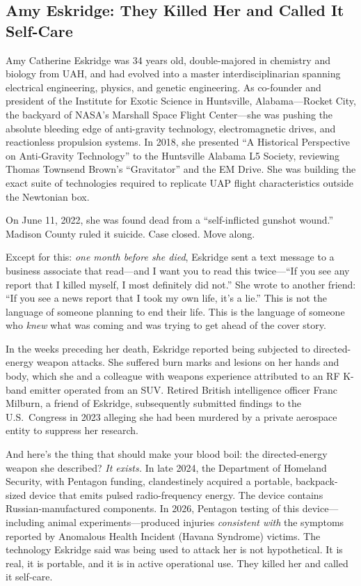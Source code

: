 \documentclass[11pt,a4paper]{article}
\begin{document}
\subsection{Amy Eskridge: They Killed Her and Called It Self-Care}

Amy Catherine Eskridge was 34 years old, double-majored in chemistry and biology from UAH, and had evolved into a master interdisciplinarian spanning electrical engineering, physics, and genetic engineering. As co-founder and president of the Institute for Exotic Science in Huntsville, Alabama---Rocket City, the backyard of NASA's Marshall Space Flight Center---she was pushing the absolute bleeding edge of anti-gravity technology, electromagnetic drives, and reactionless propulsion systems. In 2018, she presented ``A Historical Perspective on Anti-Gravity Technology'' to the Huntsville Alabama L5 Society, reviewing Thomas Townsend Brown's ``Gravitator'' and the EM Drive. She was building the exact suite of technologies required to replicate UAP flight characteristics outside the Newtonian box.

On June 11, 2022, she was found dead from a ``self-inflicted gunshot wound.'' Madison County ruled it suicide. Case closed. Move along.

Except for this: \textit{one month before she died}, Eskridge sent a text message to a business associate that read---and I want you to read this twice---``If you see any report that I killed myself, I most definitely did not.'' She wrote to another friend: ``If you see a news report that I took my own life, it's a lie.'' This is not the language of someone planning to end their life. This is the language of someone who \textit{knew} what was coming and was trying to get ahead of the cover story.

In the weeks preceding her death, Eskridge reported being subjected to directed-energy weapon attacks. She suffered burn marks and lesions on her hands and body, which she and a colleague with weapons experience attributed to an RF K-band emitter operated from an SUV. Retired British intelligence officer Franc Milburn, a friend of Eskridge, subsequently submitted findings to the U.S.\ Congress in 2023 alleging she had been murdered by a private aerospace entity to suppress her research.

And here's the thing that should make your blood boil: the directed-energy weapon she described? \textit{It exists.} In late 2024, the Department of Homeland Security, with Pentagon funding, clandestinely acquired a portable, backpack-sized device that emits pulsed radio-frequency energy. The device contains Russian-manufactured components. In 2026, Pentagon testing of this device---including animal experiments---produced injuries \textit{consistent with} the symptoms reported by Anomalous Health Incident (Havana Syndrome) victims. The technology Eskridge said was being used to attack her is not hypothetical. It is real, it is portable, and it is in active operational use. They killed her and called it self-care.
\end{document}
